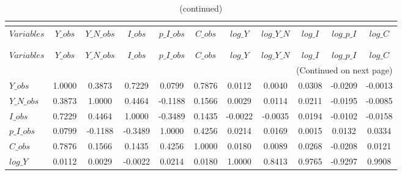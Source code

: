  
\begin{center}
\begin{longtable}{lcccccccccc} 
\caption{MATRIX OF CORRELATIONS}\\
 \label{Table:th_corr_matrix}\\
\toprule 
$Variables  $	 & 	 $      Y\_obs$	 & 	 $  Y\_N\_obs$	 & 	 $      I\_obs$	 & 	 $  p\_I\_obs$	 & 	 $      C\_obs$	 & 	 $      log\_Y$	 & 	 $  log\_Y\_N$	 & 	 $      log\_I$	 & 	 $  log\_p\_I$	 & 	 $      log\_C$\\
\midrule \endfirsthead 
\caption{(continued)}\\
 \toprule \\ 
$Variables  $	 & 	 $      Y\_obs$	 & 	 $  Y\_N\_obs$	 & 	 $      I\_obs$	 & 	 $  p\_I\_obs$	 & 	 $      C\_obs$	 & 	 $      log\_Y$	 & 	 $  log\_Y\_N$	 & 	 $      log\_I$	 & 	 $  log\_p\_I$	 & 	 $      log\_C$\\
\midrule \endhead 
\midrule \multicolumn{11}{r}{(Continued on next page)} \\ \bottomrule \endfoot 
\bottomrule \endlastfoot 
$Y\_obs     $	 & 	       1.0000	 & 	       0.3873	 & 	       0.7229	 & 	       0.0799	 & 	       0.7876	 & 	       0.0112	 & 	       0.0040	 & 	       0.0308	 & 	      -0.0209	 & 	      -0.0013 \\ 
$Y\_N\_obs  $	 & 	       0.3873	 & 	       1.0000	 & 	       0.4464	 & 	      -0.1188	 & 	       0.1566	 & 	       0.0029	 & 	       0.0114	 & 	       0.0211	 & 	      -0.0195	 & 	      -0.0085 \\ 
$I\_obs     $	 & 	       0.7229	 & 	       0.4464	 & 	       1.0000	 & 	      -0.3489	 & 	       0.1435	 & 	      -0.0022	 & 	      -0.0035	 & 	       0.0194	 & 	      -0.0102	 & 	      -0.0158 \\ 
$p\_I\_obs  $	 & 	       0.0799	 & 	      -0.1188	 & 	      -0.3489	 & 	       1.0000	 & 	       0.4256	 & 	       0.0214	 & 	       0.0169	 & 	       0.0015	 & 	       0.0132	 & 	       0.0334 \\ 
$C\_obs     $	 & 	       0.7876	 & 	       0.1566	 & 	       0.1435	 & 	       0.4256	 & 	       1.0000	 & 	       0.0180	 & 	       0.0089	 & 	       0.0268	 & 	      -0.0208	 & 	       0.0121 \\ 
$log\_Y     $	 & 	       0.0112	 & 	       0.0029	 & 	      -0.0022	 & 	       0.0214	 & 	       0.0180	 & 	       1.0000	 & 	       0.8413	 & 	       0.9765	 & 	      -0.9297	 & 	       0.9908 \\ 

\end{longtable}
\end{center}
